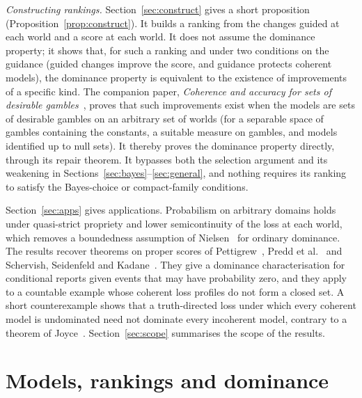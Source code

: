 \documentclass[11pt]{article}
\theoremstyle{definition}
\theoremstyle{remark}
\begin{document}
\emph{Constructing rankings.} Section~\ref{sec:construct} gives a short proposition (Proposition~\ref{prop:construct}). It builds a ranking from the changes guided at each world and a score at each world. It does not assume the dominance property; it shows that, for such a ranking and under two conditions on the guidance (guided changes improve the score, and guidance protects coherent models), the dominance property is equivalent to the existence of improvements of a specific kind. The companion paper, \emph{Coherence and accuracy for sets of desirable gambles}~\cite{KCM}, proves that such improvements exist when the models are sets of desirable gambles on an arbitrary set of worlds (for a separable space of gambles containing the constants, a suitable measure on gambles, and models identified up to null sets). It thereby proves the dominance property directly, through its repair theorem. It bypasses both the selection argument and its weakening in Sections~\ref{sec:bayes}--\ref{sec:general}, and nothing requires its ranking to satisfy the Bayes-choice or compact-family conditions.

Section~\ref{sec:apps} gives applications. Probabilism on arbitrary domains holds under quasi-strict propriety and lower semicontinuity of the loss at each world, which removes a boundedness assumption of Nielsen~\cite{Nielsen} for ordinary dominance. The results recover theorems on proper scores of Pettigrew~\cite{Pettigrew}, Predd et al.~\cite{Predd} and Schervish, Seidenfeld and Kadane~\cite{SSK09}. They give a dominance characterisation for conditional reports given events that may have probability zero, and they apply to a countable example whose coherent loss profiles do not form a closed set. A short counterexample shows that a truth-directed loss under which every coherent model is undominated need not dominate every incoherent model, contrary to a theorem of Joyce~\cite{Joyce}. Section~\ref{sec:scope} summarises the scope of the results.

\section{Models, rankings and dominance}\label{sec:setting}
\end{document}
